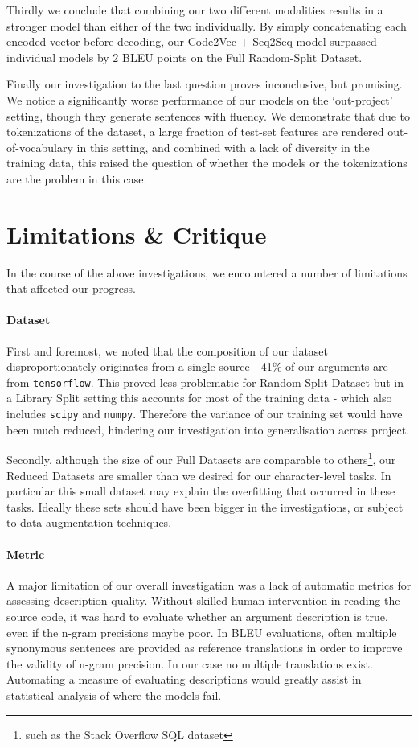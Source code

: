 Thirdly we conclude that combining our two different modalities results in a stronger model than either of the two individually. By simply concatenating each encoded vector before decoding, our Code2Vec + Seq2Seq model surpassed individual models by 2 BLEU points on the Full Random-Split Dataset.

Finally our investigation to the last question proves inconclusive, but promising. We notice a significantly worse performance of our models on the `out-project' setting, though they generate sentences with fluency. We demonstrate that due to tokenizations of the dataset, a large fraction of test-set features are rendered out-of-vocabulary in this setting, and combined with a lack of diversity in the training data, this raised the question of whether the models or the tokenizations are the problem in this case. 

\section{Limitations \& Critique}

In the course of the above investigations, we encountered a number of limitations that affected our progress.

\paragraph{Dataset} 
First and foremost, we noted that the composition of our dataset disproportionately originates from a single source - 41\% of our arguments are from \texttt{tensorflow}. This proved less problematic for Random Split Dataset but in a Library Split setting this accounts for most of the training data - which also includes \texttt{scipy} and \texttt{numpy}. Therefore the variance of our training set would have been much reduced, hindering our investigation into generalisation across project.

Secondly, although the size of our Full Datasets are comparable to others\footnote{such as the Stack Overflow SQL dataset}, our Reduced Datasets are smaller than we desired for our character-level tasks. In particular this small dataset may explain the overfitting that occurred in these tasks. Ideally these sets should have been bigger in the investigations, or subject to data augmentation techniques.

\paragraph{Metric} 
A major limitation of our overall investigation was a lack of automatic metrics for assessing description quality. Without skilled human intervention in reading the source code, it was hard to evaluate whether an argument description is true, even if the n-gram precisions maybe poor. In BLEU evaluations, often multiple synonymous sentences are provided as reference translations in order to improve the validity of n-gram precision. In our case no multiple translations exist. Automating a measure of evaluating descriptions would greatly assist in statistical analysis of where the models fail.

